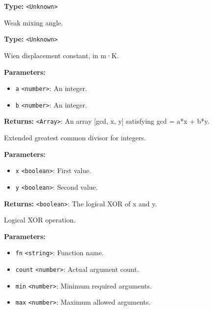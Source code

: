 \documentclass[12pt,a4paper]{article}
\begin{document}
\noindent \textbf{Type:} \texttt{<Unknown>}

\noindent Weak mixing angle.

\vspace{5mm}
\noindent {}\vspace{4mm}


\noindent \textbf{Type:} \texttt{<Unknown>}

\noindent Wien displacement constant, in m·K.

\vspace{5mm}
\noindent {}


\noindent \textbf{Parameters:}
\begin{itemize}
  \item \texttt{a} \texttt{<number>}: An integer.
  \item \texttt{b} \texttt{<number>}: An integer.
\end{itemize}

\noindent \textbf{Returns:} \texttt{<Array>}: An array [gcd, x, y] satisfying gcd = a*x + b*y.

\noindent Extended greatest common divisor for integers.

\vspace{5mm}
\noindent {}


\noindent \textbf{Parameters:}
\begin{itemize}
  \item \texttt{x} \texttt{<boolean>}: First value.
  \item \texttt{y} \texttt{<boolean>}: Second value.
\end{itemize}

\noindent \textbf{Returns:} \texttt{<boolean>}: The logical XOR of x and y.

\noindent Logical XOR operation.

\vspace{5mm}
\noindent {}


\noindent \textbf{Parameters:}
\begin{itemize}
  \item \texttt{fn} \texttt{<string>}: Function name.
  \item \texttt{count} \texttt{<number>}: Actual argument count.
  \item \texttt{min} \texttt{<number>}: Minimum required arguments.
  \item \texttt{max} \texttt{<number>}: Maximum allowed arguments.
\end{itemize}
\end{document}
